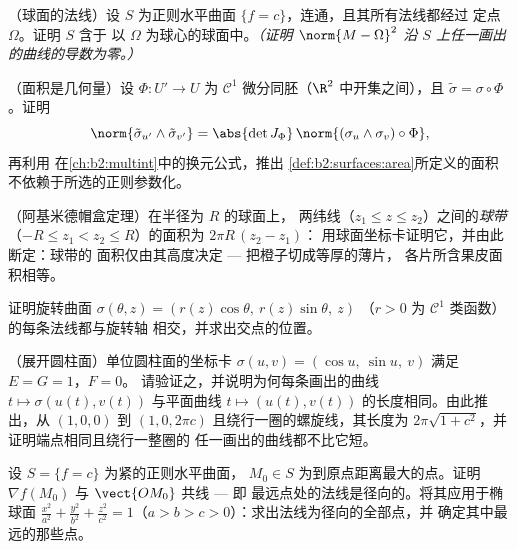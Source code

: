 \begin{exercise}[$\star\star\star$]\label{exo:b2:surfaces:7}
（球面的法线）设 $S$ 为正则水平曲面
$\{f = c\}$，连通，且其所有法线都经过
定点 $\Omega$。证明 $S$ 含于
以 $\Omega$ 为球心的球面中。\emph{（证明 $\norm{M - \Omega}^2$
沿 $S$ 上任一画出的曲线的导数为零。）}
\end{exercise}

\begin{exercise}[$\star\star\star$]\label{exo:b2:surfaces:8}
（面积是几何量）设 $\Phi \colon U' \to U$ 为 $\mathcal{C}^1$
微分同胚（$\R^2$ 中开集之间），且 $\tilde\sigma =
\sigma \circ \Phi$。证明
\[
\norm{\tilde\sigma_{u'} \wedge \tilde\sigma_{v'}}
= \abs{\det J_\Phi}\,
\norm{(\sigma_u \wedge \sigma_v)\circ\Phi} ,
\]
再利用
在\cref{ch:b2:multint}中的换元公式，推出
\cref{def:b2:surfaces:area}所定义的面积
不依赖于所选的正则参数化。
\end{exercise}

\begin{exercise}[$\star$]\label{exo:b2:surfaces:9}
（阿基米德帽盒定理）在半径为 $R$ 的球面上，
两纬线（$z_1 \leq z \leq z_2$）之间的\emph{球带}
（$-R \leq z_1 < z_2 \leq R$）的面积为 $2\pi R\,(z_2 - z_1)$：
用球面坐标卡证明它，并由此断定：球带的
面积仅由其高度决定 --- 把橙子切成等厚的薄片，
各片所含果皮面积相等。
\end{exercise}

\begin{exercise}[$\star\star$]\label{exo:b2:surfaces:10}
证明旋转曲面
$\sigma(\theta, z) = (r(z)\cos\theta,\ r(z)\sin\theta,\ z)$
（$r > 0$ 为 $\mathcal C^1$ 类函数）的每条法线都与旋转轴
相交，并求出交点的位置。
\end{exercise}

\begin{exercise}[$\star\star$]\label{exo:b2:surfaces:11}
（展开圆柱面）单位圆柱面的坐标卡 $\sigma(u, v) = (\cos u,\
\sin u,\ v)$ 满足 $E = G = 1$，$F = 0$。
请验证之，并说明为何每条画出的曲线 $t \mapsto
\sigma(u(t), v(t))$ 与平面曲线 $t
\mapsto (u(t), v(t))$ 的长度相同。由此推出，从 $(1, 0, 0)$
到 $(1, 0, 2\pi c)$ 且绕行一圈的螺旋线，其长度为
$2\pi\sqrt{1 + c^2}$，并证明端点相同且绕行一整圈的
任一画出的曲线都不比它短。
\end{exercise}

\begin{exercise}[$\star\star\star$]\label{exo:b2:surfaces:12}
设 $S = \{f = c\}$ 为紧的正则水平曲面，
$M_0 \in S$ 为到原点距离最大的点。证明
$\nabla f(M_0)$ 与 $\vect{OM_0}$ 共线 --- 即
最远点处的法线是径向的。将其应用于椭球面
$\frac{x^2}{a^2} + \frac{y^2}{b^2} + \frac{z^2}{c^2} = 1$（$a >
b > c > 0$）：求出法线为径向的全部点，并
确定其中最远的那些点。
\end{exercise}

